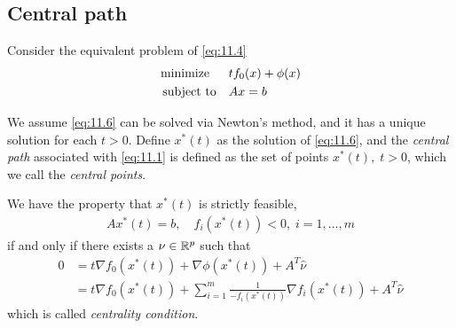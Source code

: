 \subsection{Central path}
Consider the equivalent problem of \eqref{eq:11.4}
\begin{align}
  \text{minimize\;\;}\quad& tf_0(x)+\phi(x)\label{eq:11.6}\\
  \text{subject to}  \quad& Ax=b\nonumber
\end{align}

We assume \eqref{eq:11.6} can be solved via Newton's method, and it has a unique solution for each $t>0$.
Define $x^\ast(t)$ as the solution of \eqref{eq:11.6}, and the \textit{central path} associated with \eqref{eq:11.1} is defined as the set of points $x^\ast(t),\;t>0$, which we call the \textit{central points}.\par
We have the property that $x^\ast(t)$ is strictly feasible, \ie
\begin{align*}
  Ax^\ast(t)=b,\quad f_i(x^\ast(t))<0,\;i=1,\dots,m
\end{align*}
if and only if there exists a $\nu\in\mathbb{R}^p$ such that
\begin{align}
  0 &= t\nabla f_0(x^\ast(t))+\nabla\phi(x^\ast(t))+A^T\hat{\nu}\nonumber\\
    &= t\nabla f_0(x^\ast(t))+\sum_{i=1}^m\frac{1}{-f_i(x^\ast(t))}\nabla f_i(x^\ast(t))+A^T\hat{\nu}\label{eq:11.7}
\end{align}
which is called \textit{centrality condition}.
